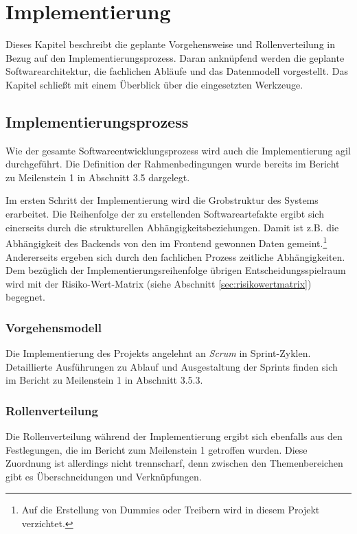\documentclass[a4paper,11pt,listof=numbered,glossary=totoc,parskip=half,toc=bib]{scrreprt}
\begin{document}
	\newpage
	\chapter{Implementierung}
	Dieses Kapitel beschreibt die geplante Vorgehensweise und Rollenverteilung in Bezug auf den Implementierungsprozess. Daran anknüpfend werden die geplante Softwarearchitektur, die fachlichen Abläufe und das Datenmodell vorgestellt. Das Kapitel schließt mit einem Überblick über die eingesetzten Werkzeuge.
	
	\section{Implementierungsprozess}
	Wie der gesamte Softwareentwicklungsprozess wird auch die Implementierung agil durchgeführt. Die Definition der Rahmenbedingungen wurde bereits im Bericht zu Meilenstein 1 in Abschnitt 3.5 dargelegt.
	
	Im ersten Schritt der Implementierung wird die Grobstruktur des Systems erarbeitet. Die Reihenfolge der zu erstellenden Softwareartefakte ergibt sich einerseits durch die strukturellen Abhängigkeitsbeziehungen. Damit ist z.B. die Abhängigkeit des Backends von den im Frontend gewonnen Daten gemeint.\footnote{Auf die Erstellung von Dummies oder Treibern wird in diesem Projekt verzichtet.} Andererseits ergeben sich durch den fachlichen Prozess zeitliche Abhängigkeiten. Dem bezüglich der Implementierungsreihenfolge übrigen Entscheidungsspielraum wird mit der Risiko-Wert-Matrix (siehe Abschnitt \ref{sec:risikowertmatrix}) begegnet.
	
	\subsection{Vorgehensmodell}
	
	Die Implementierung des Projekts angelehnt an \textit{Scrum} in Sprint-Zyklen. Detaillierte Ausführungen zu Ablauf und Ausgestaltung der Sprints finden sich im Bericht zu Meilenstein 1 in Abschnitt 3.5.3. 
	
	\subsection{Rollenverteilung}
	Die Rollenverteilung während der Implementierung ergibt sich ebenfalls aus den Festlegungen, die im Bericht zum Meilenstein 1 getroffen wurden. Diese Zuordnung ist allerdings nicht trennscharf, denn zwischen den Themenbereichen gibt es Überschneidungen und Verknüpfungen. 
	
\end{document}
